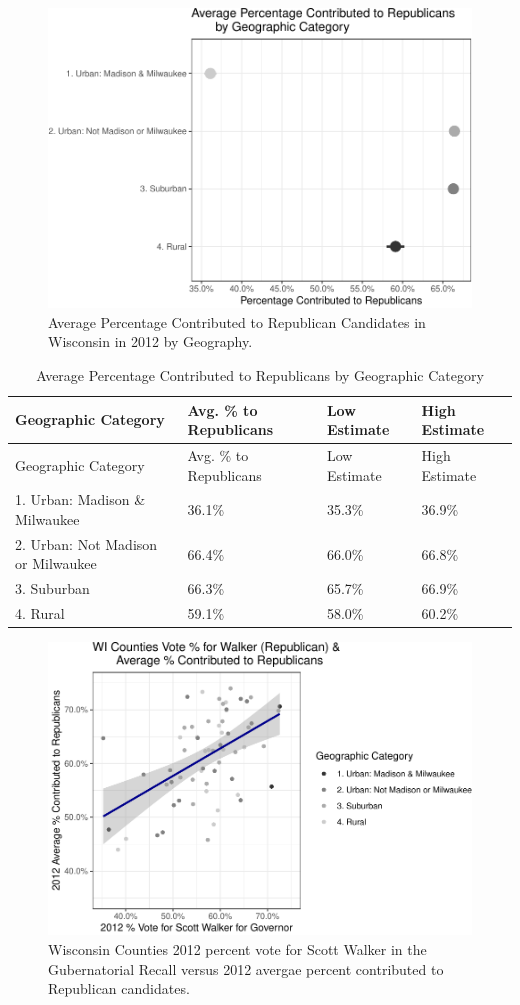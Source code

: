 \documentclass[12pt,]{article}
\begin{document}
\begin{figure}
\includegraphics[width=1\linewidth]{output_only_files/figure-latex/unnamed-chunk-8-1} \caption{Average Percentage Contributed to Republican Candidates in Wisconsin in 2012 by Geography.}\label{fig:unnamed-chunk-8}
\end{figure}

\begin{longtable}[]{@{}llll@{}}
\caption{Average Percentage Contributed to Republicans by Geographic
Category}\tabularnewline
\toprule
Geographic Category & Avg. \% to Republicans & Low Estimate & High
Estimate\tabularnewline
\midrule
\endfirsthead
\toprule
Geographic Category & Avg. \% to Republicans & Low Estimate & High
Estimate\tabularnewline
\midrule
\endhead
1. Urban: Madison \& Milwaukee & 36.1\% & 35.3\% & 36.9\%\tabularnewline
2. Urban: Not Madison or Milwaukee & 66.4\% & 66.0\% &
66.8\%\tabularnewline
3. Suburban & 66.3\% & 65.7\% & 66.9\%\tabularnewline
4. Rural & 59.1\% & 58.0\% & 60.2\%\tabularnewline
\bottomrule
\end{longtable}

\begin{figure}
\includegraphics[width=1\linewidth]{output_only_files/figure-latex/unnamed-chunk-10-1} \caption{Wisconsin Counties 2012 percent vote for Scott Walker in the Gubernatorial Recall versus 2012 avergae percent contributed to Republican candidates.}\label{fig:unnamed-chunk-10}
\end{figure}
\end{document}

